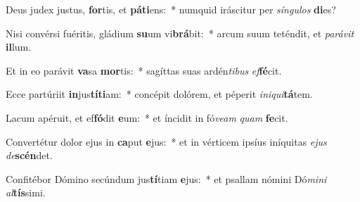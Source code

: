 \item Deus judex justus, \textbf{for}tis, et \textbf{pá}\textbf{ti}ens:~* numquid iráscitur per \textit{sín}\textit{gu}\textit{los} \textbf{di}es?
\item Nisi convérsi fuéritis, gládium \textbf{su}um vi\textbf{brá}bit:~* arcum suum teténdit, et \textit{pa}\textit{rá}\textit{vit} \textbf{il}lum.
\item Et in eo parávit \textbf{va}sa \textbf{mor}tis:~* sagíttas suas ardén\textit{ti}\textit{bus} \textit{ef}\textbf{fé}cit.
\item Ecce partúriit \textbf{in}jus\textbf{tí}\textbf{ti}am:~* concépit dolórem, et péperit \textit{in}\textit{i}\textit{qui}\textbf{tá}tem.
\item Lacum apéruit, et ef\textbf{fó}dit \textbf{e}um:~* et íncidit in fó\textit{ve}\textit{am} \textit{quam} \textbf{fe}cit.
\item Convertétur dolor ejus in \textbf{ca}put \textbf{e}jus:~* et in vérticem ipsíus iníquitas \textit{e}\textit{jus} \textit{de}\textbf{scén}det.
\item Confitébor Dómino secúndum jus\textbf{tí}tiam \textbf{e}jus:~* et psallam nómini Dó\textit{mi}\textit{ni} \textit{al}\textbf{tís}simi.

